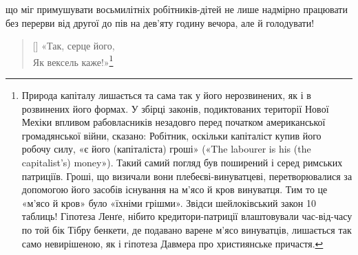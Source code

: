 \parcont{}  %
що міг примушувати восьмилітніх робітників-дітей не лише
надмірно працювати без перерви від другої до пів на дев’яту
годину вечора, але й голодувати!

\settowidth{\versewidth}{Як вексель каже!»}
\begin{verse}[\versewidth]
«Так, серце його, \\
Як вексель каже!»\footnote{
Природа капіталу лишається та сама так у його нерозвинених, як
і в розвинених його формах. У збірці законів, подиктованих території
Нової Мехіки впливом рабовласників незадовго перед початком американської
громадянської війни, сказано: Робітник, оскільки капіталіст
купив його робочу силу, «є його (капіталіста) гроші» («The labourer
is his (the capitalist's) money»). Такий самий погляд був поширений і серед
римських патриціїв. Гроші, що визичали вони плебеєві-винуватцеві,
перетворювалися за допомогою його засобів існування на м'ясо й кров
винуватця. Тим то це «м’ясо й кров» було «їхніми грішми». Звідси шейлоківський
закон 10 таблиць! Гіпотеза Ленґе, нібито кредитори-патриції
влаштовували час-від-часу по той бік Тібру бенкети, де подавано варене
м’ясо винуватців, лишається так само невирішеною, як і гіпотеза
Давмера про християнське причастя.
}
\end{verse}

